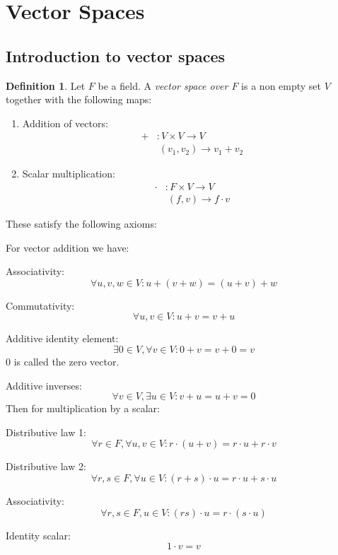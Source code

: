 \documentclass{report}
\makeatletter
\theoremstyle{remark}
\theoremstyle{definition}
\newtheorem{definition}[theorem]{Definition}
\theoremstyle{definition}
\theoremstyle{theorem}
\providecommand{\varitem}{} %
\newenvironment{axioms}[1]
 {\renewcommand\varitem[1]{\item[\textbf{#1\arabic{enumi}\rlap{$##1$}.}]%
    \edef\@currentlabel{#1\arabic{enumi}{$##1$}}}%
  \enumerate[label=\textbf{#1\arabic*.}, ref=#1\arabic*]}
 {\endenumerate}
\makeatother
\begin{document}
\section{Vector Spaces}
\subsection{Introduction to vector spaces}
\begin{definition}
Let $F$ be a field. A \emph{vector space over $F$} is a non empty set $V$ together with the following maps:
\begin{enumerate}
    \item Addition of vectors:
    \begin{align*}
        + &: V \times V \rightarrow V\\
        & \> (v_1, v_2) \rightarrow v_1 + v_2
    \end{align*}
    \item Scalar multiplication:
    \begin{align*}
        \cdot &:F \times V \rightarrow V\\
        & \> (f,v) \rightarrow f \cdot v
    \end{align*}
\end{enumerate}
These satisfy the following axioms: \par 
For vector addition we have:
\begin{axioms}{A}
    \item Associativity: 
    \[ \forall u,v,w \in V: u + (v + w) = (u + v) + w \] \label{ax:A1}
    \item Commutativity:
    \[ \forall u,v \in V: u + v = v + u \]\label{ax:A2}
    \item Additive identity element:
    \[ \exists 0 \in V, \forall v \in V: 0 + v = v + 0 = v \]
    0 is called the zero vector.\label{ax:A3}
    \item \label{ax:A4}Additive inverses:
    \[\forall v \in V, \exists u \in V: v + u = u + v = 0 \]
    Then for multiplication by a scalar:
    \item \label{ax:A5} Distributive law 1:
    \[ \forall r \in F, \forall u,v \in V: r \cdot(u + v) = r \cdot u + r \cdot v \]
    \item \label{ax:A6} Distributive law 2:
    \[ \forall r,s \in F, \forall u \in V: (r+s) \cdot u = r \cdot u + s \cdot u \]
    \item \label{ax:A7} Associativity:
    \[ \forall r,s \in F, u \in V: (rs) \cdot u = r \cdot(s \cdot u) \]
    \item \label{ax:A8} Identity scalar:
    \[1 \cdot v = v \]
\end{axioms}
\end{definition}
\end{document}
